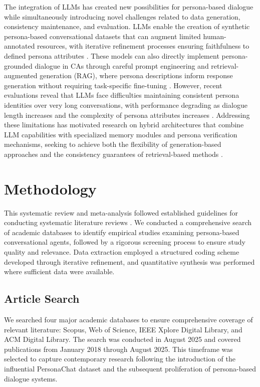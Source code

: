 \documentclass{article}
\begin{document}
The integration of LLMs has created new possibilities for persona-based dialogue while simultaneously introducing novel challenges related to data generation, consistency maintenance, and evaluation. LLMs enable the creation of synthetic persona-based conversational datasets that can augment limited human-annotated resources, with iterative refinement processes ensuring faithfulness to defined persona attributes \citep{jandaghi2023faithful}. These models can also directly implement persona-grounded dialogue in CAs through careful prompt engineering and retrieval-augmented generation (RAG), where persona descriptions inform response generation without requiring task-specific fine-tuning \citep{ahn2023mpchat}. However, recent evaluations reveal that LLMs face difficulties maintaining consistent persona identities over very long conversations, with performance degrading as dialogue length increases and the complexity of persona attributes increases \citep{maharana2024evaluating,lee2025examining}. Addressing these limitations has motivated research on hybrid architectures that combine LLM capabilities with specialized memory modules and persona verification mechanisms, seeking to achieve both the flexibility of generation-based approaches and the consistency guarantees of retrieval-based methods \citep{zhang2024hello,lee2025examining}.
\section{Methodology}

This systematic review and meta-analysis followed established guidelines for conducting systematic literature reviews \citep{kitchenham2007guidelines}. We conducted a comprehensive search of academic databases to identify empirical studies examining persona-based conversational agents, followed by a rigorous screening process to ensure study quality and relevance. Data extraction employed a structured coding scheme developed through iterative refinement, and quantitative synthesis was performed where sufficient data were available.

\subsection{Article Search}

We searched four major academic databases to ensure comprehensive coverage of relevant literature: Scopus, Web of Science, IEEE Xplore Digital Library, and ACM Digital Library. The search was conducted in August 2025 and covered publications from January 2018 through August 2025. This timeframe was selected to capture contemporary research following the introduction of the influential PersonaChat dataset \citep{zhang2018personalizing} and the subsequent proliferation of persona-based dialogue systems.
\end{document}
